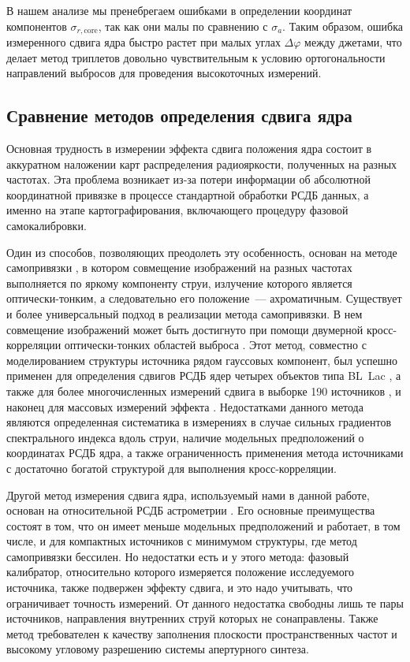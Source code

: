 В нашем анализе мы пренебрегаем ошибками в определении координат компонентов
$\sigma_{r,\textrm{core}}$, так как они малы по сравнению с $\sigma_a$. Таким образом, ошибка
измеренного сдвига ядра быстро растет при малых углах $\Delta \varphi$ между джетами, что делает
метод триплетов довольно чувствительным к условию ортогональности направлений выбросов для
проведения высокоточных измерений.


\subsection{Сравнение методов определения сдвига ядра}

Основная трудность в измерении эффекта сдвига положения ядра состоит
в аккуратном наложении карт распределения радиояркости, полученных на
разных частотах. Эта проблема возникает из-за потери информации об
абсолютной координатной привязке в процессе стандартной обработки
РСДБ данных, а именно на этапе картографирования, включающего процедуру
фазовой самокалибровки.

Один из способов, позволяющих преодолеть эту особенность, основан на методе
самопривязки \cite{Lobanov_1998,Kovalev_2008,Sokolovsky_2011}, в котором
совмещение изображений на разных частотах выполняется по яркому компоненту
струи, излучение которого является оптически-тонким, а следовательно его
положение~--- ахроматичным. Существует и более универсальный подход в
реализации метода самопривязки. В нем совмещение изображений может быть
достигнуто при помощи двумерной кросс-корреляции оптически-тонких областей
выброса \cite{Walker_2000}. Этот метод, совместно с
моделированием структуры источника рядом гауссовых компонент, был успешно
применен для определения сдвигов РСДБ ядер четырех объектов типа BL~Lac
\cite{Sullivan_2009}, а также для более многочисленных измерений сдвига в
выборке 190 источников \cite{Pushkarev_2012}, и наконец для массовых
измерений эффекта \cite{Plavin2018}. Недостатками данного метода
являются определенная систематика в измерениях в случае сильных градиентов
спектрального индекса вдоль струи, наличие модельных предположений о
координатах РСДБ ядра, а также ограниченность применения метода источниками
с достаточно богатой структурой для выполнения кросс-корреляции.

Другой метод измерения сдвига ядра, используемый нами в данной работе,
основан на относительной РСДБ астрометрии \cite{MS1984}. Его основные преимущества состоят
в том, что он имеет меньше модельных предположений и работает, в том числе,
и для компактных источников с минимумом структуры, где метод самопривязки
бессилен. Но недостатки есть и у этого метода: фазовый калибратор,
относительно которого измеряется положение исследуемого источника, также
подвержен эффекту сдвига, и это надо учитывать, что ограничивает точность
измерений. От данного недостатка свободны лишь те пары источников, направления
внутренних струй которых не сонаправлены. Также метод требователен к
качеству заполнения плоскости пространственных частот и высокому угловому
разрешению системы апертурного синтеза.


